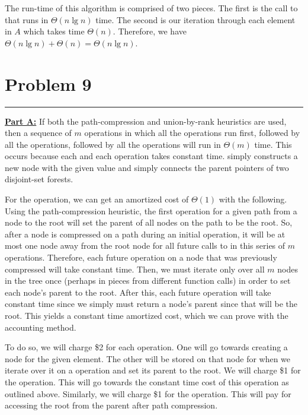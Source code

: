 \documentclass[11pt]{article}
\def\separateline{\medskip\hrule\medskip}
\begin{document}
The run-time of this algorithm is comprised of two pieces. The first is the call to  that runs in $\Theta(n\lg{n})$ time. The second is our iteration through each element in $A$ which takes time $\Theta(n)$. Therefore, we have $\Theta(n\lg{n}) + \Theta(n) = \Theta(n\lg{n})$.\\

\newpage

\section{Problem 9}
\separateline

\textbf{\underline{Part A:}} If both the path-compression and union-by-rank heuristics are used, then a sequence of $m$ operations in which all the  operations run first, followed by all the  operations, followed by all the  operations will run in $\Theta(m)$ time. This occurs because each  and each  operation takes constant time.  simply constructs a new node with the given value and  simply connects the parent pointers of two disjoint-set forests.

For the  operation, we can get an amortized cost of $\Theta(1)$ with the following. Using the path-compression heuristic, the first  operation for a given path from a node to the root will set the parent of all nodes on the path to be the root. So, after a node is compressed on a path during an initial  operation, it will be at most one node away from the root node for all future calls to  in this series of $m$ operations. Therefore, each future  operation on a node that was previously compressed will take constant time. Then, we must iterate only over all $m$ nodes in the tree once (perhaps in pieces from different function calls) in order to set each node's parent to the root. After this, each future  operation will take constant time since we simply must return a node's parent since that will be the root. This yields a constant time amortized cost, which we can prove with the accounting method.

To do so, we will charge \$2 for each  operation. One will go towards creating a node for the given element. The other will be stored on that node for when we iterate over it on a  operation and set its parent to the root. We will charge \$1 for the  operation. This will go towards the constant time cost of this operation as outlined above. Similarly, we will charge \$1 for the  operation. This will pay for accessing the root from the parent after path compression.
\end{document}
